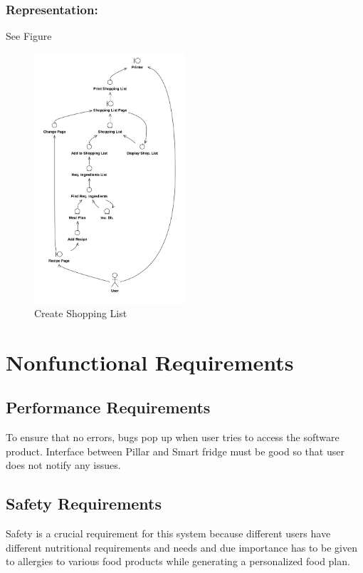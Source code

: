 		\subsubsection{Representation:} See Figure~\thesubsection
		\begin{figure}[p]
			\centering
			\includegraphics[width=0.5\textwidth]{shopping.png}
			\caption{Create Shopping List}
		\end{figure}


\section{Nonfunctional Requirements} 


\subsection{Performance Requirements}
To ensure that no errors, bugs pop up when user tries to access the software product. Interface between Pillar and Smart fridge must be good so that user does not notify any issues.

\subsection{Safety Requirements}
Safety is a crucial requirement for this system because different users have different nutritional requirements and needs and due importance has to be given to allergies to various food products while generating a personalized food plan.

